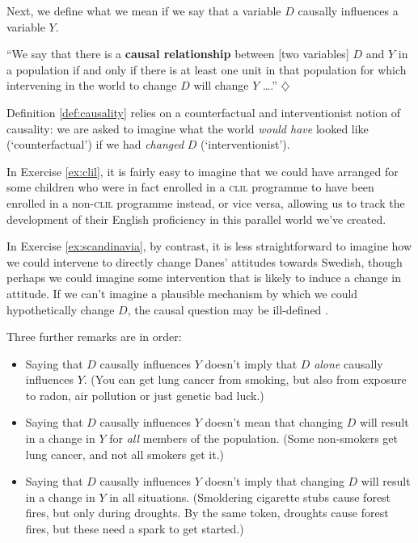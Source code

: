 \documentclass[a4paper]{tufte-book}\usepackage[]{graphicx}\usepackage[]{xcolor}
\newcommand{\term}[1]{\textbf{#1}}
\newcommand*{\parend}[1][$\diamondsuit$]{%
  \unskip\nobreak\hspace{1em plus 1fill}$\diamondsuit$%
}
\begin{document}
Next, we define what we mean if we say that a variable $D$ causally influences
a variable $Y$.

\label{def:causality}
``We say that there is a \term{causal relationship} between
[two variables] $D$ and $Y$ in a population if and only if there is at least
one unit in that population for which intervening in the world
to change $D$ will change $Y$ \dots.'' \citep[p. 3]{Keele2019}
\parend

Definition \ref{def:causality} relies on a counterfactual and interventionist 
notion of causality:
we are asked to imagine what the world \emph{would have} looked like 
(`counterfactual') if we had \emph{changed} $D$ (`interventionist').

In Exercise \ref{ex:clil}, 
it is fairly easy to imagine that we could have arranged for some children who were
in fact enrolled in a \textsc{clil} programme to have been enrolled in a
non-\textsc{clil} programme instead, or vice versa, allowing us to track
the development of their English proficiency in this parallel world we've created.

In Exercise \ref{ex:scandinavia}, by contrast, it is less straightforward to
imagine how we could intervene to directly change Danes' attitudes towards Swedish,
though perhaps we could imagine some intervention that is likely to induce
a change in attitude.
If we can't imagine a plausible mechanism by which we could hypothetically
change $D$, the causal question may be ill-defined \citep[see][]{Holland1986}.

Three further remarks are in order:

\begin{itemize}
  \item Saying that $D$ causally influences $Y$ doesn't imply
  that $D$ \emph{alone} causally influences $Y$.
  (You can get lung cancer from smoking, but also from exposure to
  radon, air pollution or just genetic bad luck.)

  \item Saying that $D$ causally influences $Y$ doesn't mean
  that changing $D$ will result in a change in $Y$ for \emph{all} members
  of the population.
  (Some non-smokers get lung cancer, and not all smokers get it.)

  \item Saying that $D$ causally influences $Y$ doesn't imply
  that changing $D$ will result in a change in $Y$ in all situations.
  (Smoldering cigarette stubs cause forest fires, but only during droughts.
  By the same token, droughts cause forest fires, but these need a spark to get started.)
\end{itemize}
\end{document}
